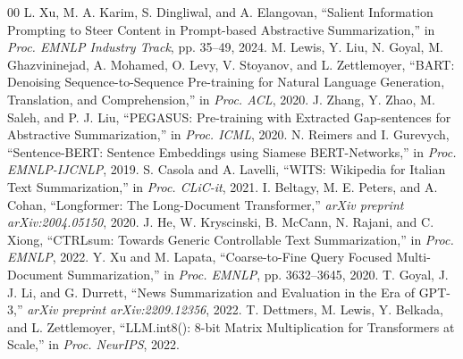 \documentclass[conference]{IEEEtran}
\begin{document}
\begin{thebibliography}{00}
 L. Xu, M. A. Karim, S. Dingliwal, and A. Elangovan, ``Salient Information Prompting to Steer Content in Prompt-based Abstractive Summarization,'' in \textit{Proc. EMNLP Industry Track}, pp. 35--49, 2024.
 M. Lewis, Y. Liu, N. Goyal, M. Ghazvininejad, A. Mohamed, O. Levy, V. Stoyanov, and L. Zettlemoyer, ``BART: Denoising Sequence-to-Sequence Pre-training for Natural Language Generation, Translation, and Comprehension,'' in \textit{Proc. ACL}, 2020.
 J. Zhang, Y. Zhao, M. Saleh, and P. J. Liu, ``PEGASUS: Pre-training with Extracted Gap-sentences for Abstractive Summarization,'' in \textit{Proc. ICML}, 2020.
 N. Reimers and I. Gurevych, ``Sentence-BERT: Sentence Embeddings using Siamese BERT-Networks,'' in \textit{Proc. EMNLP-IJCNLP}, 2019.
 S. Casola and A. Lavelli, ``WITS: Wikipedia for Italian Text Summarization,'' in \textit{Proc. CLiC-it}, 2021.
 I. Beltagy, M. E. Peters, and A. Cohan, ``Longformer: The Long-Document Transformer,'' \textit{arXiv preprint arXiv:2004.05150}, 2020.
 J. He, W. Kryscinski, B. McCann, N. Rajani, and C. Xiong, ``CTRLsum: Towards Generic Controllable Text Summarization,'' in \textit{Proc. EMNLP}, 2022.
 Y. Xu and M. Lapata, ``Coarse-to-Fine Query Focused Multi-Document Summarization,'' in \textit{Proc. EMNLP}, pp. 3632--3645, 2020.
 T. Goyal, J. J. Li, and G. Durrett, ``News Summarization and Evaluation in the Era of GPT-3,'' \textit{arXiv preprint arXiv:2209.12356}, 2022.
 T. Dettmers, M. Lewis, Y. Belkada, and L. Zettlemoyer, ``LLM.int8(): 8-bit Matrix Multiplication for Transformers at Scale,'' in \textit{Proc. NeurIPS}, 2022.
\end{thebibliography}
\end{document}
